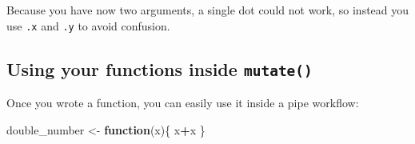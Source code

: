 \documentclass[]{gitbook}
\newenvironment{Shaded}{\begin{snugshade}}{\end{snugshade}}
\newcommand{\ControlFlowTok}[1]{\textcolor[rgb]{0.13,0.29,0.53}{\textbf{#1}}}
\newcommand{\DataTypeTok}[1]{\textcolor[rgb]{0.13,0.29,0.53}{#1}}
\newcommand{\KeywordTok}[1]{\textcolor[rgb]{0.13,0.29,0.53}{\textbf{#1}}}
\newcommand{\NormalTok}[1]{#1}
\newcommand{\OperatorTok}[1]{\textcolor[rgb]{0.81,0.36,0.00}{\textbf{#1}}}
\newcommand{\StringTok}[1]{\textcolor[rgb]{0.31,0.60,0.02}{#1}}
\theoremstyle{definition}
\theoremstyle{definition}
\theoremstyle{definition}
\theoremstyle{remark}
\begin{document}
Because you have now two arguments, a single dot could not work, so
instead you use \texttt{.x} and \texttt{.y} to avoid confusion.

\hypertarget{using-your-functions-inside-mutate}{%
\subsection{\texorpdfstring{Using your functions inside
\texttt{mutate()}}{Using your functions inside mutate()}}\label{using-your-functions-inside-mutate}}

Once you wrote a function, you can easily use it inside a pipe workflow:

\begin{Shaded}
\begin{Highlighting}[]
\NormalTok{double_number <-}\StringTok{ }\ControlFlowTok{function}\NormalTok{(x)\{}
\NormalTok{  x}\OperatorTok{+}\NormalTok{x}
\NormalTok{\}}
\end{Highlighting}
\end{Shaded}

\begin{Shaded}
\end{Shaded}
\end{document}
